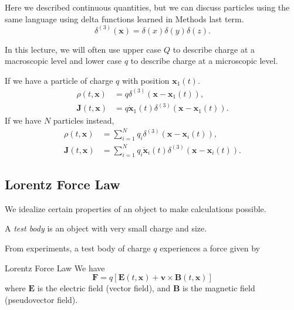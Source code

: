     Here we described continuous quantities, but we can discuss particles using the same language using delta functions learned in Methods last term.
    \[
        \delta^{(3)}(\mathbf{x}) = \delta(x)\delta(y)\delta(z).
    \]
    \begin{note}
        In this lecture, we will often use upper case \(Q\) to describe charge at a macroscopic level and lower case \(q\) to describe charge at a microscopic level.
    \end{note}
    If we have a particle of charge \(q\) with position \(\mathbf{x}_1 (t)\).
    \begin{align*}
        \rho(t, \mathbf{x}) &= q\delta^{(3)}(\mathbf{x} - \mathbf{x}_1(t)),\\
        \mathbf{J} (t,\mathbf{x}) &= q \dot{\mathbf{x}}_1(t)\delta^{(3)}(\mathbf{x} - \mathbf{x} _1(t)).
    \end{align*}
    If we have \(N\) particles instead,
    \begin{align*}
        \rho(t, \mathbf{x}) &= \sum\limits_{i=1}^{N} q_i\delta^{(3)}(\mathbf{x} - \mathbf{x}_i(t)),\\
        \mathbf{J} (t,\mathbf{x}) &= \sum\limits_{i=1}^{N} q_i \dot{\mathbf{x}}_i(t)\delta^{(3)}(\mathbf{x} - \mathbf{x} _i(t)). 
    \end{align*}
\subsection{Lorentz Force Law}
We idealize certain properties of an object to make calculations possible.
\begin{definition}{}{}
    A \textit{test body} is an object with very small charge and size.
\end{definition}
From experiments, a test body of charge \(q\) experiences a force given by
\begin{theorem}{Lorentz Force Law}{}
    We have
    \[\textbf{F} = q[\textbf{E}(t, \textbf{x}) + \textbf{v}\times \textbf{B}(t, \textbf{x})]\]
    where \(\mathbf{E} \) is the electric field (vector field), and \(\mathbf{B} \) is the magnetic field (pseudovector field).
\end{theorem}

